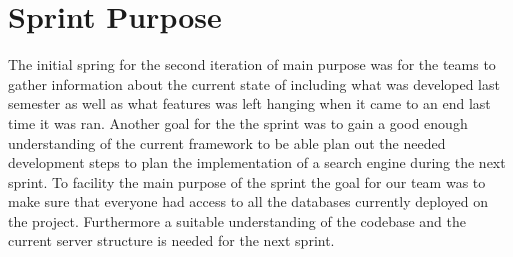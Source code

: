 \section{Sprint Purpose}
The initial spring for the second iteration of \knox main purpose was for the teams to gather information 
about the current state of \knox including what was developed last semester as well as what features was 
left hanging when it came to an end last time it was ran. Another goal for the the sprint was to gain a 
good enough understanding of the current framework to be able plan out the needed development steps to 
plan the implementation of a search engine during the next sprint. 
To facility the main purpose of the sprint the goal for our team was to make sure that everyone had 
access to all the databases currently deployed on the \knox project. Furthermore a suitable understanding 
of the codebase and the current server structure is needed for the next sprint.

